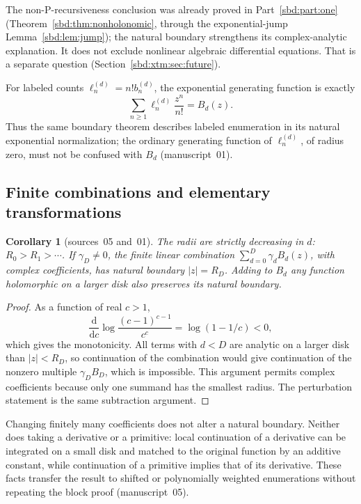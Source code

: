 \documentclass[11pt,a4paper]{article}
\newtheorem{corollary}[theorem]{Corollary}
\theoremstyle{definition}
\begin{document}
The non-P-recursiveness conclusion was already proved in
Part~\ref{sbd:part:one} (Theorem~\ref{sbd:thm:nonholonomic}, through the
exponential-jump Lemma~\ref{sbd:lem:jump}); the natural boundary strengthens
its complex-analytic explanation. It does not exclude nonlinear algebraic
differential equations. That is a separate question
(Section~\ref{sbd:xtm:sec:future}).

For labeled counts $\ell_n^{(d)}=n!b_n^{(d)}$, the exponential generating
function is exactly
\[
 \sum_{n\ge1}\ell_n^{(d)}\frac{z^n}{n!}=B_d(z).
\]
Thus the same boundary theorem describes labeled enumeration in its natural
exponential normalization; the ordinary generating function of
$\ell_n^{(d)}$, of radius zero, must not be confused with $B_d$
(manuscript~01).

\subsection{Finite combinations and elementary transformations}
\begin{corollary}[sources~05 and~01]\label{sbd:edge:cor:mixtures}
The radii are strictly decreasing in $d$: $R_0>R_1>\cdots$. If
$\gamma_D\ne0$, the finite linear combination $\sum_{d=0}^D\gamma_dB_d(z)$,
with complex coefficients, has natural boundary $|z|=R_D$. Adding to $B_d$
any function holomorphic on a larger disk also preserves its natural
boundary.
\end{corollary}
\begin{proof}
As a function of real $c>1$,
\[
 \frac{\mathrm d}{\mathrm dc}
 \log\frac{(c-1)^{c-1}}{c^c}=\log(1-1/c)<0,
\]
which gives the monotonicity. All terms with $d<D$ are analytic on a larger
disk than $|z|<R_D$, so continuation of the combination would give
continuation of the nonzero multiple $\gamma_DB_D$, which is impossible.
This argument permits complex coefficients because only one summand has the
smallest radius. The perturbation statement is the same subtraction
argument.
\end{proof}

Changing finitely many coefficients does not alter a natural boundary.
Neither does taking a derivative or a primitive: local continuation of a
derivative can be integrated on a small disk and matched to the original
function by an additive constant, while continuation of a primitive implies
that of its derivative. These facts transfer the result to shifted or
polynomially weighted enumerations without repeating the block proof
(manuscript~05).
\end{document}
